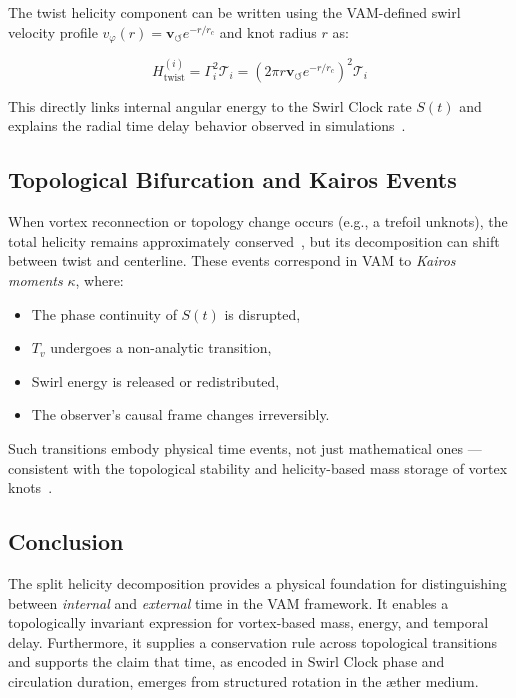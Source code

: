 \documentclass[12pt]{article}
\begin{document}
  The twist helicity component can be written using the VAM-defined swirl velocity profile $v_\varphi(r) = \mathbf{v}_{\scriptscriptstyle\boldsymbol{\circlearrowleft}} e^{-r/r_c}$ and knot radius $r$ as:

  \begin{equation}
    H_\text{twist}^{(i)} = \Gamma_i^2 \mathcal{T}_i = \left(2\pi r \mathbf{v}_{\scriptscriptstyle\boldsymbol{\circlearrowleft}} e^{-r/r_c}\right)^2 \mathcal{T}_i
  \end{equation}

  This directly links internal angular energy to the Swirl Clock rate $S(t)$ and explains the radial time delay behavior observed in simulations~\cite{VAM2}.

  \subsection*{Topological Bifurcation and Kairos Events}

  When vortex reconnection or topology change occurs (e.g., a trefoil unknots), the total helicity remains approximately conserved~\cite{Tao2021}, but its decomposition can shift between twist and centerline. These events correspond in VAM to \emph{Kairos moments} $\kappa$, where:

  \begin{itemize}
    \item The phase continuity of $S(t)$ is disrupted,
    \item $T_v$ undergoes a non-analytic transition,
    \item Swirl energy is released or redistributed,
    \item The observer’s causal frame changes irreversibly.
  \end{itemize}

  Such transitions embody physical time events, not just mathematical ones — consistent with the topological stability and helicity-based mass storage of vortex knots~\cite{SwirlGravity}.

  \subsection*{Conclusion}

  The split helicity decomposition provides a physical foundation for distinguishing between \emph{internal} and \emph{external} time in the VAM framework. It enables a topologically invariant expression for vortex-based mass, energy, and temporal delay. Furthermore, it supplies a conservation rule across topological transitions and supports the claim that time, as encoded in Swirl Clock phase and circulation duration, emerges from structured rotation in the æther medium.
\end{document}
